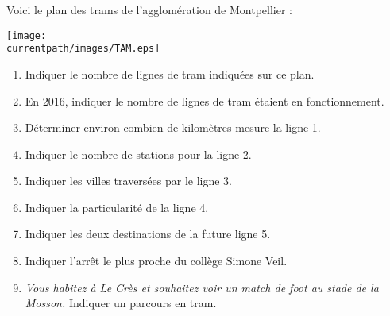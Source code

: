 \begin{exercice}
    Voici le plan des trams de l'agglomération de Montpellier : \\ [1mm]
    \begin{minipage}{11.5cm}
       \texttt{[image: \\currentpath/images/TAM.eps]}
    \end{minipage}
    \quad
    \begin{minipage}{5.5cm}
       \begin{enumerate}
          \item Indiquer le nombre de lignes de tram indiquées sur ce plan.
          \item En 2016, indiquer le nombre de lignes de tram étaient en fonctionnement.
          \item Déterminer environ combien de kilomètres mesure la ligne 1.
          \item Indiquer le nombre de stations pour la ligne 2.
          \item Indiquer les villes traversées par le ligne 3.
          \item Indiquer la particularité de la ligne 4.
          \item Indiquer les deux destinations de la future ligne 5.
          \item Indiquer l'arrêt le plus proche du collège Simone Veil.
          \item \textit{Vous habitez à Le Crès et souhaitez voir un match de foot au stade de la Mosson.}
          Indiquer un parcours en tram.
       \end{enumerate}
    \end{minipage}
 \end{exercice}
